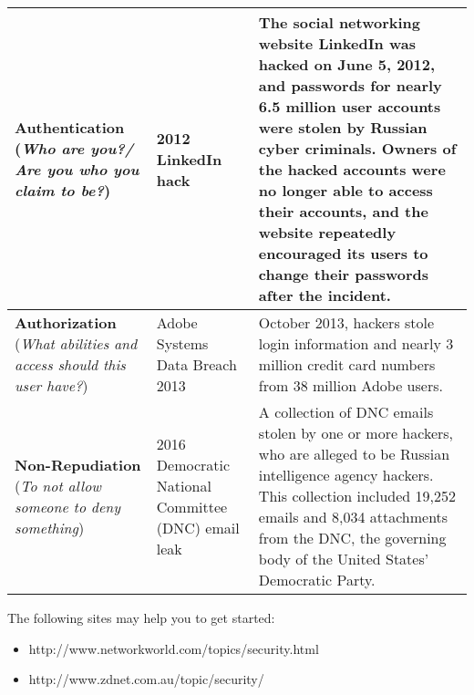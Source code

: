 \documentclass[11pt,letterpaper]{article}
\begin{document}
\begin{table}[htbp]
\begin{tabularx}{\columnwidth}{|p{3.4cm}|p{3.4cm}|X|}
        \hline
        \textbf{Authentication} (\textit{Who are you?/ Are you who you claim to be?}) & 2012 LinkedIn hack
        & The social networking website LinkedIn was hacked on June 5, 2012, and passwords for nearly 6.5 million user accounts were stolen by Russian cyber criminals. Owners of the hacked accounts were no longer able to access their accounts, and the website repeatedly encouraged its users to change their passwords after the incident\cite{LinkedIn}.
        \\ \hline
        
        \hline
        \textbf{Authorization} (\textit{What abilities and access should this user have?}) & Adobe Systems Data Breach 2013
        & October 2013, hackers stole login information and nearly 3 million credit card numbers from 38 million Adobe users\cite{Adobe}.
        \\ \hline
        
        \hline
        \textbf{Non-Repudiation} (\textit{To not allow someone to deny something}) &
        2016 Democratic National Committee (DNC) email leak
        & A collection of DNC emails stolen by one or more hackers, who are alleged to be Russian intelligence agency hackers. This collection included 19,252 emails and 8,034 attachments from the DNC, the governing body of the United States' Democratic Party\cite{dnc_mails}.
        \\ \hline
        
        
    \end{tabularx}
\end{table}

The following sites may help you to get started:
\begin{itemize}
    \item http://www.networkworld.com/topics/security.html
    \item http://www.zdnet.com.au/topic/security/ 
\end{itemize}
%
%
%        
%        
%        
\end{document}
